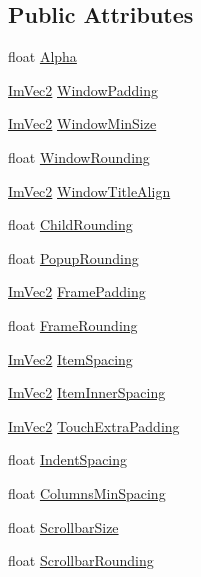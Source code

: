 \subsection*{Public Attributes}
\begin{DoxyCompactItemize}
\item 
float \hyperlink{struct_im_gui_style_a993312606e9dcb7ca165245150a4da72}{Alpha}
\item 
\hyperlink{struct_im_vec2}{Im\+Vec2} \hyperlink{struct_im_gui_style_a37f156b53e6dcc99ff57366ceafe8b50}{Window\+Padding}
\item 
\hyperlink{struct_im_vec2}{Im\+Vec2} \hyperlink{struct_im_gui_style_a060b2f743a086d0f0fee4cd5b3f372d4}{Window\+Min\+Size}
\item 
float \hyperlink{struct_im_gui_style_acd902c2ab4b53d4bb0f64da608320894}{Window\+Rounding}
\item 
\hyperlink{struct_im_vec2}{Im\+Vec2} \hyperlink{struct_im_gui_style_a3fc57a15ab8f206045f1e5dfccd8b2e7}{Window\+Title\+Align}
\item 
float \hyperlink{struct_im_gui_style_aba2b4c6be52366ce2ac06b7849cd5cb2}{Child\+Rounding}
\item 
float \hyperlink{struct_im_gui_style_a44b39e666946eea00001b6e38ab6bdc7}{Popup\+Rounding}
\item 
\hyperlink{struct_im_vec2}{Im\+Vec2} \hyperlink{struct_im_gui_style_af58dc4e954ac95fdb3b0df8efb2fa564}{Frame\+Padding}
\item 
float \hyperlink{struct_im_gui_style_a15402cededdef985487e986ccce73ad2}{Frame\+Rounding}
\item 
\hyperlink{struct_im_vec2}{Im\+Vec2} \hyperlink{struct_im_gui_style_a6bc07d81e049cd75e86e6b3753c0da4a}{Item\+Spacing}
\item 
\hyperlink{struct_im_vec2}{Im\+Vec2} \hyperlink{struct_im_gui_style_a1a12021be99583fb491cff2df75d1ae1}{Item\+Inner\+Spacing}
\item 
\hyperlink{struct_im_vec2}{Im\+Vec2} \hyperlink{struct_im_gui_style_ab518a0a67df8f14765acc491d7b460f4}{Touch\+Extra\+Padding}
\item 
float \hyperlink{struct_im_gui_style_a32ea292dee2b4e178a227acacd061921}{Indent\+Spacing}
\item 
float \hyperlink{struct_im_gui_style_a8fed04481e1d75bb95c97819f545e2ba}{Columns\+Min\+Spacing}
\item 
float \hyperlink{struct_im_gui_style_a96623380e624d2f2ec207449e700a226}{Scrollbar\+Size}
\item 
float \hyperlink{struct_im_gui_style_a00efbadb1ad7daa0ee7384864b147d71}{Scrollbar\+Rounding}

\end{DoxyCompactItemize}
